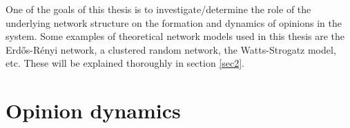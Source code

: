 \documentclass[11 pt , letterpaper , twoside , openright]{book}
\begin{document}
One of the goals of this thesis is to investigate/determine the role of the underlying network structure on the formation and dynamics of opinions in the system. Some examples of theoretical network models used in this thesis are the Erd\H{o}s-R\'{e}nyi network, a clustered random network, the Watts-Strogatz model, etc. These will be explained thoroughly in section \ref{sec2}. %



\section{Opinion dynamics}
\end{document}
